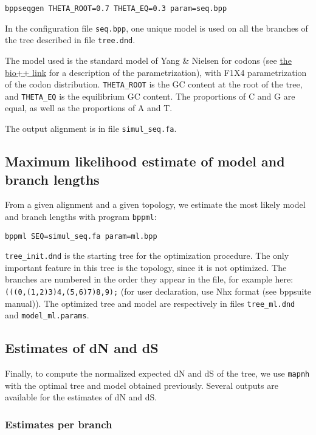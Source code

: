 \documentclass[11pt, a4paper]{article}
\begin{document}
\begin{verbatim}
bppseqgen THETA_ROOT=0.7 THETA_EQ=0.3 param=seq.bpp
\end{verbatim}

In the configuration file \texttt{seq.bpp}, one unique model is used
on all the branches of the tree described in
file \texttt{tree.dnd}. 

The model used is the standard model of Yang \& Nielsen for codons
(see
\href{https://pbil.univ-lyon1.fr/bpp-doc/bpp-phyl/html/classbpp_1_1YN98.html#details}{the
  bio++ link} for a description of the parametrization), with F1X4
parametrization of the codon distribution. \verb|THETA_ROOT| is the GC
content at the root of the tree, and \verb|THETA_EQ| is the
equilibrium GC content. The proportions of C and G are equal, as well
as the proportions of A and T.

The output alignment is in file \texttt{simul\_seq.fa}.


\subsection*{Maximum likelihood estimate of model and branch lengths}

From a given alignment and a given topology, we estimate the most
likely model and branch lengths with program \texttt{bppml}:

\begin{verbatim}
bppml SEQ=simul_seq.fa param=ml.bpp
\end{verbatim}

\texttt{tree\_init.dnd} is the starting tree for the optimization
procedure. The only important feature in this tree is the topology,
since it is not optimized. The branches are numbered in the order they
appear in the file, for example here:
\texttt{(((0,(1,2)3)4,(5,6)7)8,9);} (for user declaration, use Nhx
format (see bppsuite manual)). The optimized tree and model are
respectively in files \texttt{tree\_ml.dnd} and
\texttt{model\_ml.params}.

\subsection*{Estimates of dN and dS}

Finally, to compute the normalized expected dN and dS of the tree, we
use \texttt{mapnh} with the optimal tree and model obtained
previously. Several outputs are available for the estimates of dN and
dS.

\subsubsection*{Estimates per branch}
\end{document}
